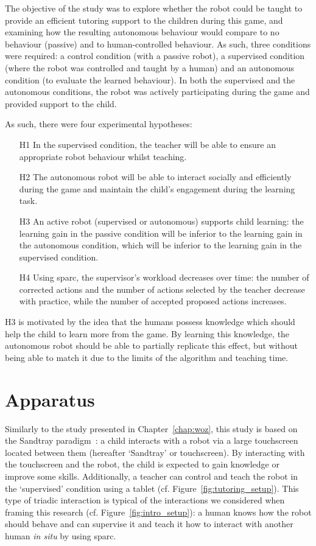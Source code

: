 The objective of the study was to explore whether the robot could be taught to provide an efficient tutoring support to the children during this game, 
and examining how the resulting autonomous behaviour would compare to no behaviour (passive) and to human-controlled behaviour. As such, three conditions were required: a control condition (with a passive robot), a supervised condition (where the robot was controlled and taught by a human) and an autonomous condition (to evaluate the learned behaviour). In both the supervised and the autonomous conditions, the robot was actively participating during the game and provided support to the child.

As such, there were four experimental hypotheses:
\begin{itemize}
	\item [H1] In the supervised condition, the teacher will be able to ensure an appropriate robot behaviour whilst teaching.
	\item [H2] The autonomous robot will be able to interact socially and efficiently during the game and maintain the child's engagement during the learning task.
	\item [H3] An active robot (supervised or autonomous) supports child learning: the learning gain in the passive condition will be inferior to the learning gain in the autonomous condition, which will be inferior to the learning gain in the supervised condition.
	\item [H4] Using \gls{sparc}, the supervisor's workload decreases over time: the number of corrected actions and the number of actions selected  by the teacher decrease with practice, while the number of accepted proposed actions increases.
\end{itemize}

H3 is motivated by the idea that the humans possess knowledge which should help the child to learn more from the game. By learning this knowledge, the autonomous robot should be able to partially replicate this effect, but without being able to match it due to the limits of the algorithm and teaching time.

\section{Apparatus}

Similarly to the study presented in Chapter~\ref{chap:woz}, this study is based on the Sandtray paradigm~\citep{baxter2012touchscreen}: a child interacts with a robot via a large touchscreen located between them (hereafter `Sandtray' or touchscreen). By interacting with the touchscreen and the robot, the child is expected to gain knowledge or improve some skills. Additionally, a teacher can control and teach the robot in the `supervised' condition using a tablet (cf. Figure~\ref{fig:tutoring_setup}). This type of triadic interaction is typical of the interactions we considered when framing this research (cf. Figure~\ref{fig:intro_setup}): a human knows how the robot should behave and can supervise it and teach it how to interact with another human \textit{in situ} by using \gls{sparc}.

